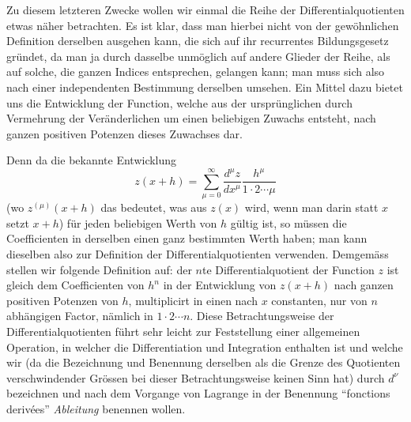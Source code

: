 \documentclass[12pt,a4paper]{article}
\begin{document}
Zu diesem letzteren Zwecke wollen wir einmal die Reihe der Differentialquotienten etwas n\"aher betrachten. Es ist klar, dass man hierbei nicht von der gew\"ohnlichen Definition derselben ausgehen kann, die sich auf ihr recurrentes Bildungsgesetz gr\"undet, da man ja durch dasselbe unm\"oglich auf andere Glieder der Reihe, als auf solche, die ganzen Indices entsprechen, gelangen kann; man muss sich also nach einer independenten Bestimmung derselben umsehen. Ein Mittel dazu bietet uns die Entwicklung der Function, welche aus der urspr\"unglichen durch Vermehrung der Ver\"anderlichen um einen beliebigen Zuwachs entsteht, nach ganzen positiven Potenzen dieses Zuwachses dar.

Denn da die bekannte Entwicklung
\begin{equation}\label{eq:entwicklung1}
z(x+h) = \sum_{\mu=0}^{\infty} \frac{d^\mu z}{dx^\mu} \frac{h^\mu}{1 \cdot 2 \cdots \mu}
\end{equation}
(wo $z^{(\mu)}(x+h)$ das bedeutet, was aus $z(x)$ wird, wenn man darin statt $x$ setzt $x+h$) f\"ur jeden beliebigen Werth von $h$ g\"ultig ist, so m\"ussen die Coefficienten in derselben einen ganz bestimmten Werth haben; man kann dieselben also zur Definition der Differentialquotienten verwenden. Demgem\"ass stellen wir folgende Definition auf: der $n$te Differentialquotient der Function $z$ ist gleich dem Coefficienten von $h^n$ in der Entwicklung von $z(x+h)$ nach ganzen positiven Potenzen von $h$, multiplicirt in einen nach $x$ constanten, nur von $n$ abh\"angigen Factor, n\"amlich in $1 \cdot 2 \cdots n$. Diese Betrachtungsweise der Differentialquotienten f\"uhrt sehr leicht zur Feststellung einer allgemeinen Operation, in welcher die Differentiation und Integration enthalten ist und welche wir (da die Bezeichnung und Benennung derselben als die Grenze des Quotienten verschwindender Gr\"ossen bei dieser Betrachtungsweise keinen Sinn hat) durch $d^\nu$ bezeichnen und nach dem Vorgange von Lagrange in der Benennung ``fonctions deriv\'{e}es'' \emph{Ableitung} benennen wollen.
\end{document}

